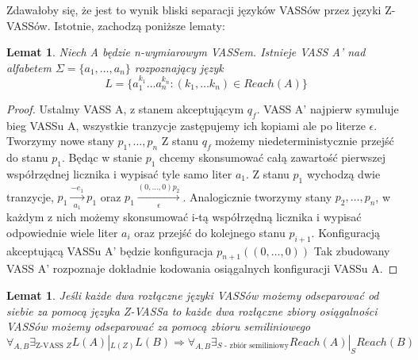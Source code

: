 \documentclass[magisterska]{pracamgr}
\newtheorem{lemma}[theorem]{Lemat}
\newtheorem{proof}[theorem]{Dowód}
\begin{document}
    Zdawałoby się, że jest to wynik bliski separacji języków VASSów przez języki Z-VASSów.
    Istotnie, zachodzą poniższe lematy:
    \begin{lemma}
        \label{reach_language}
        Niech A będzie n-wymiarowym VASSem.
        Istnieje VASS A' nad alfabetem $\Sigma=\{a_1,\dots,a_n\}$ rozpoznający język
        \[L=\{a_{1}^{k_1} \dots a_{n}^{k_n}:(k_1, \dots k_n) \in Reach(A)\}\]
    \end{lemma}
    \begin{proof}
        Ustalmy VASS A, z stanem akceptującym $q_f$.
        VASS A' najpierw symuluje bieg VASSu A, wszystkie tranzycje zastępujemy ich kopiami ale po literze $\epsilon$.
        Tworzymy nowe stany $p_1, \dots , p_n$
        Z stanu $q_f$ możemy niedeterministycznie przejść do stanu $p_1$.
        Będąc w stanie $p_1$ chcemy skonsumować całą zawartość pierwszej współrzędnej licznika i wypisać tyle samo liter $a_1$.
        Z stanu $p_1$ wychodzą dwie tranzycje, $p_1 \xrightarrow[a_1]{-e_1} p_1$ oraz $p_1 \xrightarrow[\epsilon]{(0,\dots,0) p_2}$.
        Analogicznie tworzymy stany $p_2,\dots, p_n$, w każdym z nich możemy skonsumować  i-tą współrzędną licznika i wypisać
        odpowiednie wiele liter $a_i$ oraz przejść do kolejnego stanu $p_{i+1}$.
        Konfiguracją akceptującą VASSu A' będzie konfiguracja $p_{n+1}((0, \dots, 0))$
        Tak zbudowany VASS A' rozpoznaje dokładnie kodowania osiągalnych konfiguracji VASSu A.
    \end{proof}
    \begin{lemma}
        \label{Redukcja_zetchego}
        Jeśli każde dwa rozłączne języki VASSów możemy odseparować od siebie za pomocą języka Z-VASSa to każde dwa rozłączne
        zbiory osiągalności VASSów możemy odseparować za pomocą zbioru semiliniowego
        \[\forall_{A,B}\exists_{\text{Z-VASS }Z} L(A) |_{L(Z)} L(B) \Rightarrow \forall_{A,B} \exists_{S\text{ - zbiór semiliniowy}} Reach(A) |_S Reach(B)\]
    \end{lemma}
\end{document}

